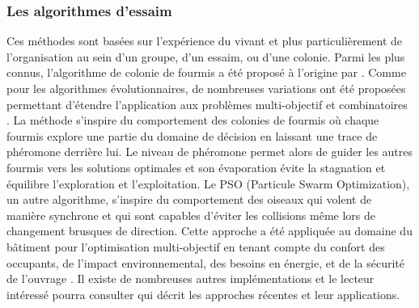 \subsubsection{Les algorithmes d’essaim} %
\label{ssub:les_algorithmes_d_essaim}
Ces méthodes sont basées sur l’expérience du vivant et plus particulièrement de
l’organisation au sein d’un groupe, d’un essaim, ou d’une colonie. Parmi les plus connus,
l’algorithme de colonie de fourmis a été proposé à l’origine par \cite{Colorni1992509}.
Comme pour les algorithmes évolutionnaires, de nombreuses variations ont été proposées
permettant d’étendre l’application aux problèmes multi-objectif et combinatoires
\parencite{MichaelGuntsch2003,Shea2006627}.
La méthode s’inspire du comportement des colonies de fourmis où chaque fourmis
explore une partie du domaine de décision en laissant une trace de phéromone derrière lui.
Le niveau de phéromone permet alors de guider les autres fourmis vers les solutions
optimales et son évaporation évite la stagnation et équilibre l’exploration et
l’exploitation.
Le PSO (Particule Swarm Optimization), un autre algorithme, s’inspire du comportement des oiseaux
qui volent de manière synchrone et qui sont capables d’éviter les collisions même lors
de changement brusques de direction. Cette approche a été appliquée au domaine
du bâtiment pour l’optimisation multi-objectif en tenant compte du confort des occupants,
de l’impact environnemental, des besoins en énergie, et de la sécurité de l’ouvrage \parencite{Armand-Decker2015}.
Il existe de nombreuses autres implémentations et le lecteur intéressé pourra consulter
\cite{Aboul-EllaHassanien2015} qui décrit les approches récentes et leur applications.


